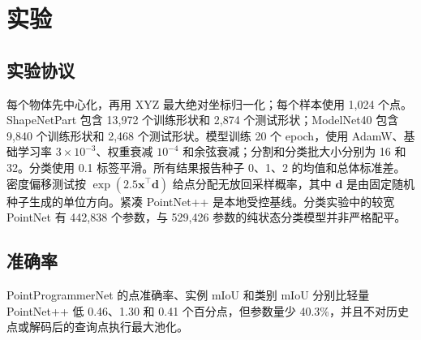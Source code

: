 \documentclass[UTF8,a4paper,11pt,fontset=windows]{ctexart}
\begin{document}
\section{实验}

\subsection{实验协议}

每个物体先中心化，再用 XYZ 最大绝对坐标归一化；每个样本使用 1,024 个点。ShapeNetPart 包含 13,972 个训练形状和 2,874 个测试形状；ModelNet40 包含 9,840 个训练形状和 2,468 个测试形状。模型训练 20 个 epoch，使用 AdamW、基础学习率 $3\times10^{-3}$、权重衰减 $10^{-4}$ 和余弦衰减；分割和分类批大小分别为 16 和 32。分类使用 0.1 标签平滑。所有结果报告种子 0、1、2 的均值和总体标准差。密度偏移测试按 $\exp(2.5\bm x^\top\bm d)$ 给点分配无放回采样概率，其中 $\bm d$ 是由固定随机种子生成的单位方向。紧凑 PointNet++ 是本地受控基线。分类实验中的较宽 PointNet 有 442,838 个参数，与 529,426 参数的纯状态分类模型并非严格配平。

\subsection{准确率}

\begin{table}[htbp]
\centering
\caption{ShapeNetPart 部件分割结果。输入为 XYZ，每个样本 1,024 个点，结果为三个随机种子的均值 $\pm$ 总体标准差。}
\end{table}

PointProgrammerNet 的点准确率、实例 mIoU 和类别 mIoU 分别比轻量 PointNet++ 低 0.46、1.30 和 0.41 个百分点，但参数量少 40.3\%，并且不对历史点或解码后的查询点执行最大池化。

\begin{table}[htbp]
\centering
\caption{ModelNet40 分类结果。结果为三个随机种子的均值 $\pm$ 总体标准差。}
\end{table}
\end{document}
